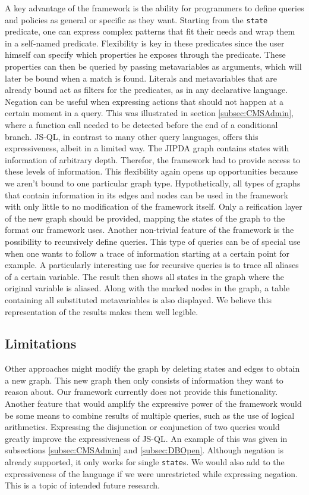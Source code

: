 A key advantage of the framework is the ability for programmers to define queries and policies as general or specific as they want. Starting from the \texttt{state} predicate, one can express complex patterns that fit their needs and wrap them in a self-named predicate. Flexibility is key in these predicates since the user himself can specify which properties he exposes through the predicate. These properties can then be queried by passing metavariables as arguments, which will later be bound when a match is found. Literals and metavariables that are already bound act as filters for the predicates, as in any declarative language.
Negation can be useful when expressing actions that should not happen at a certain moment in a query. This was illustrated in section \ref{subsec:CMSAdmin}, where a function call needed to be detected before the end of a conditional branch. JS-QL, in contrast to many other query languages, offers this expressiveness, albeit in a limited way. 
The JIPDA graph contains states with information of arbitrary depth. Therefor, the framework had to provide access to these levels of information. This flexibility again opens up opportunities because we aren't bound to one particular graph type. Hypothetically, all types of graphs that contain information in its edges and nodes can be used in the framework with only little to no modification of the framework itself. Only a reification layer of the new graph should be provided, mapping the states of the graph to the format our framework uses.
Another non-trivial feature of the framework is the possibility to recursively define queries. This type of queries can be of special use when one wants to follow a trace of information starting at a certain point for example. A particularly interesting use for recursive queries is to trace all aliases of a certain variable. The result then shows all states in the graph where the original variable is aliased. Along with the marked nodes in the graph, a table containing all substituted metavariables is also displayed. We believe this representation of the results makes them well legible.

\subsection{Limitations}

Other approaches might modify the graph by deleting states and edges to obtain a new graph. This new graph then only consists of information they want to reason about. Our framework currently does not provide this functionality. Another feature that would amplify the expressive power of the framework would be some means to combine results of multiple queries, such as the use of logical arithmetics. Expressing the disjunction or conjunction of two queries would greatly improve the expressiveness of JS-QL. An example of this was given in subsections \ref{subsec:CMSAdmin} and \ref{subsec:DBOpen}. 
Although negation is already supported, it only works for single \texttt{state}s. We would also add to the expressiveness of the language if we were unrestricted while expressing negation. This is a topic of intended future research.


